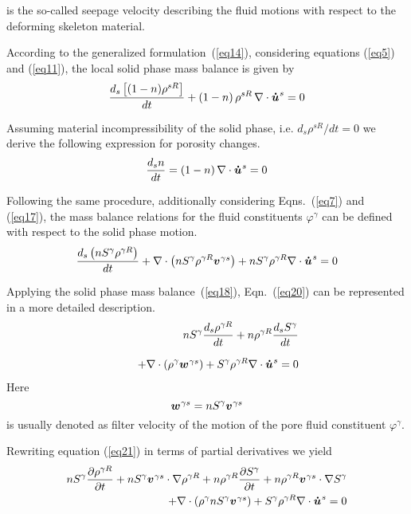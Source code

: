 is the so-called seepage velocity describing the fluid motions with respect to the deforming skeleton material.

According to the generalized formulation~(\ref{eq14}), considering equations (\ref{eq5}) and (\ref{eq11}), the local solid phase mass balance is given by
\begin{equation}
\frac{d_s\left[(1-n)\rho^{sR}\right]}{dt}+(1-n)\,\rho^{sR}\,\nabla\cdot\mio{u}{s}{\dot}=0
\label{eq18}
\end{equation}

Assuming material incompressibility of the solid phase, i.e. $d_s\rho^{sR}/dt\!\!=\!\!0$ 
we derive the following expression for porosity changes.
\begin{equation}
\frac{d_s n}{dt}
=
(1-n)\,\nabla\cdot\mio{u}{s}{\dot}=0
\label{eq18a}
\end{equation}

Following the same procedure, additionally considering Eqns.~(\ref{eq7}) and (\ref{eq17}), the mass balance relations for the fluid constituents $\varphi^{\gamma}$
can be defined with respect to the solid phase motion.
\begin{equation}
\frac{d_s\left(nS^{\gamma}\rho^{\gamma R}\right)}{dt}+
\nabla\cdot\left(nS^{\gamma}\rho^{\gamma R}\mio{v}{\gamma s}{}\right)+
nS^{\gamma}\rho^{\gamma R}\nabla\cdot\mio{u}{s}{\dot}=0
\label{eq20}
\end{equation}

Applying the solid phase mass balance~(\ref{eq18}), Eqn.~(\ref{eq20}) can be represented in a more detailed description.
\begin{eqnarray}
& & 
nS^{\gamma}\frac{d_s\rho^{\gamma R}}{dt}+n\rho^{\gamma R}\frac{d_sS^{\gamma}}{dt} \nonumber \\[1.5ex]
& & \quad
+\nabla\cdot(\rho^{\gamma}\mio{w}{\gamma s}{})+S^{\gamma}\rho^{\gamma R}\nabla\cdot\mio{u}{s}{\dot}=0
\label{eq21}
\end{eqnarray}
Here
\begin{equation}
\mio{w}{\gamma s}{}=nS^{\gamma}\mio{v}{\gamma s}{}
\label{eq22}
\end{equation}
is usually denoted as filter velocity of the motion of the pore fluid constituent $\varphi^{\gamma}$.

Rewriting equation (\ref{eq21}) in terms of partial derivatives we yield
\begin{eqnarray}
nS^{\gamma} \frac{\partial\rho^{\gamma R}}{\partial t} + nS^{\gamma} \mio{v}{\gamma s}{} \cdot \nabla \rho^{\gamma R}
+
n\rho^{\gamma R}\frac{\partial S^{\gamma}}{\partial t} + n\rho^{\gamma R} \mio{v}{\gamma s}{} \cdot \nabla S^{\gamma}
\nonumber \\ %
+
\nabla\cdot(\rho^{\gamma}nS^{\gamma}\mio{v}{\gamma s}{})+S^{\gamma}\rho^{\gamma R}\nabla\cdot\mio{u}{s}{\dot}=0
\label{eqn:phase_mass_balance}
\end{eqnarray}

